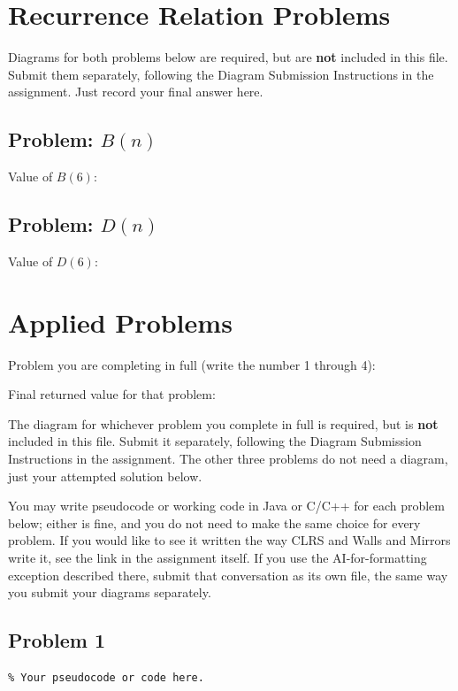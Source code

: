 \documentclass[11pt]{article}
\begin{document}
\section{Recurrence Relation Problems}
Diagrams for both problems below are required, but are \textbf{not}
included in this file. Submit them separately, following the Diagram
Submission Instructions in the assignment. Just record your final answer
here.

\subsection{Problem: $B(n)$}
Value of $B(6)$: \underline{\hspace{1.5in}}

\subsection{Problem: $D(n)$}
Value of $D(6)$: \underline{\hspace{1.5in}}

\section{Applied Problems}
Problem you are completing in full (write the number 1 through 4):
\underline{\hspace{1in}}

\noindent Final returned value for that problem: \underline{\hspace{1.5in}}

The diagram for whichever problem you complete in full is required, but is
\textbf{not} included in this file. Submit it separately, following the
Diagram Submission Instructions in the assignment. The other three problems
do not need a diagram, just your attempted solution below.

You may write pseudocode or working code in Java or C/C++ for each problem
below; either is fine, and you do not need to make the same choice for
every problem. If you would like to see it written the way CLRS and Walls
and Mirrors write it, see the link in the assignment itself. If you use the
AI-for-formatting exception described there, submit that conversation as
its own file, the same way you submit your diagrams separately.

\subsection{Problem 1}
\begin{lstlisting}
% Your pseudocode or code here.
\end{lstlisting}
\end{document}
